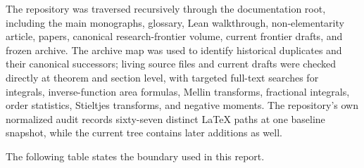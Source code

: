 \documentclass[11pt,oneside]{article}
\theoremstyle{definition}
\begin{document}
The repository was traversed recursively through the documentation root, including the
main monographs, glossary, Lean walkthrough, non-elementarity article, papers, canonical
research-frontier volume, current frontier drafts, and frozen archive.  The archive map
was used to identify historical duplicates and their canonical successors; living source
files and current drafts were checked directly at theorem and section level, with targeted
full-text searches for integrals, inverse-function area formulas, Mellin transforms,
fractional integrals, order statistics, Stieltjes transforms, and negative moments.
The repository's own normalized audit records sixty-seven distinct LaTeX paths at one
baseline snapshot, while the current tree contains later additions as well.

The following table states the boundary used in this report.
\end{document}
